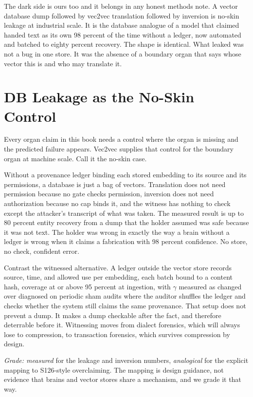The dark side is ours too and it belongs in any honest methods note. A vector database dump followed by vec2vec translation followed by inversion is no-skin leakage at industrial scale. It is the database analogue of a model that claimed handed text as its own 98 percent of the time without a ledger, now automated and batched to eighty percent recovery. The shape is identical. What leaked was not a bug in one store. It was the absence of a boundary organ that says whose vector this is and who may translate it.

\section{DB Leakage as the No-Skin Control}
\label{sec:ch09-noskin}

Every organ claim in this book needs a control where the organ is missing and the predicted failure appears. Vec2vec supplies that control for the boundary organ at machine scale. Call it the no-skin case.

Without a provenance ledger binding each stored embedding to its source and its permissions, a database is just a bag of vectors. Translation does not need permission because no gate checks permission, inversion does not need authorization because no cap binds it, and the witness has nothing to check except the attacker's transcript of what was taken. The measured result is up to 80 percent entity recovery from a dump that the holder assumed was safe because it was not text. The holder was wrong in exactly the way a brain without a ledger is wrong when it claims a fabrication with 98 percent confidence. No store, no check, confident error.

Contrast the witnessed alternative. A ledger outside the vector store records source, time, and allowed use per embedding, each batch bound to a content hash, coverage at or above 95 percent at ingestion, with $\gamma$ measured as changed over diagnosed on periodic sham audits where the auditor shuffles the ledger and checks whether the system still claims the same provenance. That setup does not prevent a dump. It makes a dump checkable after the fact, and therefore deterrable before it. Witnessing moves from dialect forensics, which will always lose to compression, to transaction forensics, which survives compression by design.

\textit{Grade: measured} for the leakage and inversion numbers, \textit{analogical} for the explicit mapping to S126-style overclaiming. The mapping is design guidance, not evidence that brains and vector stores share a mechanism, and we grade it that way.

